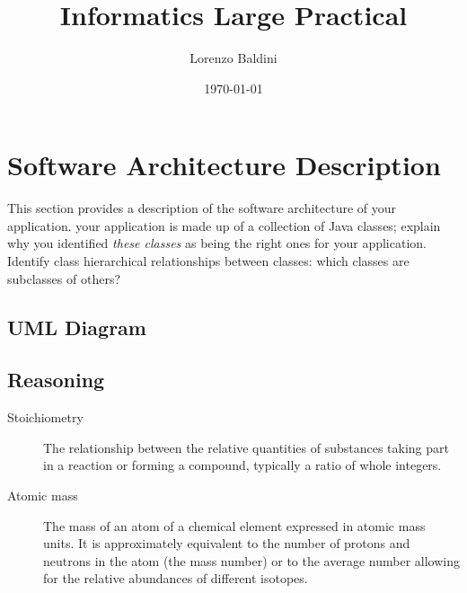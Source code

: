 \documentclass{article}
\title{Informatics Large Practical} %
\author{Lorenzo Baldini} %
\date{\today} %
\begin{document}
\maketitle %





\pagebreak


\tableofcontents
\pagebreak


\section{Software Architecture Description}

This section provides a description of the software architecture of your application. your application is made up of a collection of Java classes; explain why you identified \textit{these classes} as being the right ones for your application. Identify class hierarchical relationships between classes: which classes are subclasses of others?\\[1]


\subsection{UML Diagram}
\label{UML Diagram}
\begin{description}
    \begin{center}
        
    \end{center}
\end{description} 

\subsection{Reasoning}
\label{Reasoning}
\begin{description}
\item[Stoichiometry]
The relationship between the relative quantities of substances taking part in a reaction or forming a compound, typically a ratio of whole integers.
\item[Atomic mass]
The mass of an atom of a chemical element expressed in atomic mass units. It is approximately equivalent to the number of protons and neutrons in the atom (the mass number) or to the average number allowing for the relative abundances of different isotopes. 
\end{description} 
\end{document}
